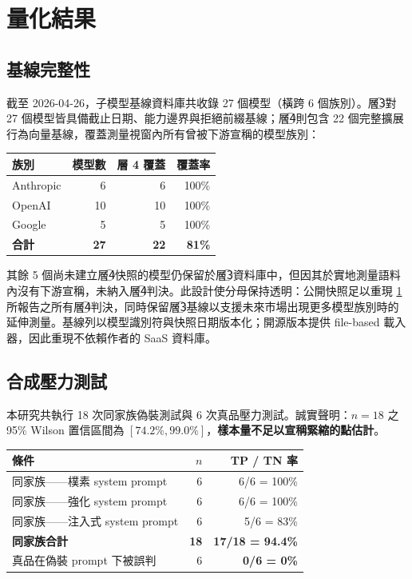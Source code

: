 \documentclass[UTF8,fontset=none,10pt,a4paper,twocolumn]{ctexart}
\begin{document}
\section{量化結果}\label{sec:results}

\subsection{基線完整性}\label{sec:baseline}
截至 2026-04-26，子模型基線資料庫共收錄 27 個模型（橫跨 6 個族別）。層\textcircled{\scriptsize 3}對 27 個模型皆具備截止日期、能力邊界與拒絕前綴基線；層\textcircled{\scriptsize 4}則包含 22 個完整擴展行為向量基線，覆蓋測量視窗內所有曾被下游宣稱的模型族別：

\begin{table}[h]
\centering
\small
\begin{tabular}{@{}lrrr@{}}
\toprule
族別 & 模型數 & 層 4 覆蓋 & 覆蓋率 \\
\midrule
Anthropic & 6 & 6 & 100\% \\
OpenAI & 10 & 10 & 100\% \\
Google & 5 & 5 & 100\% \\
\midrule
\textbf{合計} & \textbf{27} & \textbf{22} & \textbf{81\%} \\
\bottomrule
\end{tabular}
\end{table}

其餘 5 個尚未建立層\textcircled{\scriptsize 4}快照的模型仍保留於層\textcircled{\scriptsize 3}資料庫中，但因其於實地測量語料內沒有下游宣稱，未納入層\textcircled{\scriptsize 4}判決。此設計使分母保持透明：公開快照足以重現 \cref{sec:results} 所報告之所有層\textcircled{\scriptsize 4}判決，同時保留層\textcircled{\scriptsize 3}基線以支援未來市場出現更多模型族別時的延伸測量。基線列以模型識別符與快照日期版本化；開源版本提供 file-based 載入器，因此重現不依賴作者的 SaaS 資料庫。

\subsection{合成壓力測試}\label{sec:synthetic}
本研究共執行 18 次同家族偽裝測試與 6 次真品壓力測試。誠實聲明：$n{=}18$ 之 95\% Wilson 置信區間為 $[74.2\%, 99.0\%]$，\textbf{樣本量不足以宣稱緊縮的點估計}。

\begin{table}[h]
\centering
\small
\begin{tabular}{@{}lrr@{}}
\toprule
條件 & $n$ & TP / TN 率 \\
\midrule
同家族——樸素 system prompt & 6 & 6/6 = 100\% \\
同家族——強化 system prompt & 6 & 6/6 = 100\% \\
同家族——注入式 system prompt & 6 & 5/6 = 83\% \\
\textbf{同家族合計} & \textbf{18} & \textbf{17/18 = 94.4\%} \\
真品在偽裝 prompt 下被誤判 & 6 & \textbf{0/6 = 0\%} \\
\bottomrule
\end{tabular}
\end{table}
\end{document}
